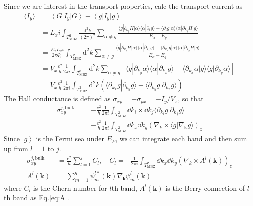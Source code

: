 \documentclass[12pt,a4paper]{article}
\newcommand{\bra}[1]{\left\langle{#1}\right|}
\newcommand{\ket}[1]{\left|{#1}\right\rangle}
\newcommand{\braket}[2]{\langle{#1}|{#2}\rangle}
\begin{document}
    Since we are interest in the transport properties, calc the transport current as
    \begin{align*}
        \langle I_y \rangle &= \bra{G}I_y\ket{G} - \bra{g}I_y\ket{g} \\
        &= L_x i \int_{T^2_{\mathrm{MBZ}}} \frac{\mathrm{d}^2 k}{(2\pi)^2} \sum_{\alpha \neq g}
        \frac{
            \braket{g}{\partial_{k_y} H|\alpha}\braket{\alpha}{\partial_t g}
            - \braket{\partial_t g}{\alpha}\braket{\alpha}{\partial_{k_y} H|g}
        }{E_\alpha - E_g} \\
        &= \frac{E_x L_x i}{2\pi \Phi_0} \int_{T^2_{\mathrm{MBZ}}} \mathrm{d}^2 k \sum_{\alpha \neq g}
        \frac{
            \braket{g}{\partial_{k_y} H|\alpha}\braket{\alpha}{\partial_{k_x} g}
            - \braket{\partial_{k_x} g}{\alpha}\braket{\alpha}{\partial_{k_y} H|g}
        }{E_\alpha - E_g} \\
        &= V_x \frac{e^2}{h} \frac{1}{2\pi i} \int_{T^2_{\mathrm{MBZ}}} \mathrm{d}^2 k \sum_{\alpha \neq g}
        \left[
            \braket{g}{\partial_{k_y} \alpha}\braket{\alpha}{\partial_{k_x} g}
            + \braket{\partial_{k_x} \alpha}{g}\braket{g}{\partial_{k_y} \alpha}
        \right] \\
        &= V_x \frac{e^2}{h} \frac{1}{2\pi i} \int_{T^2_{\mathrm{MBZ}}} \mathrm{d}^2 k
        \left(
            \braket{\partial_{k_x} g}{\partial_{k_y} g}
            - \braket{\partial_{k_y} g}{\partial_{k_x} g}
        \right)
    \end{align*}
    The Hall conductance is defined as $\sigma_{xy}=-\sigma_{yx} = -I_y/V_x$, so that
    \begin{equation}
    \begin{aligned}
        \sigma_{xy}^{j,\mathrm{bulk}}
        &\, = - \frac{e^2}{h} \frac{1}{2\pi i} \int_{T_{\mathrm{MBZ}}^2}  \dd k_i\times \dd k_j \braket{\partial_{k_i}g}{\partial_{k_j}g} \\
        &\, = - \frac{e^2}{h} \frac{1}{2\pi i} \int_{T_{\mathrm{MBZ}}^2}  \dd k_x \dd k_y \left(\nabla_k \times \braket{g}{\nabla_\mathbf{k} g} \right)_z
    \end{aligned}
    \end{equation}
    Since $\ket{g}$ is the Fermi sea under $E_F$, we can integrate each band and then sum up from $l=1$ to $j$.
    \begin{align}
        \sigma_{xy}^{j,\mathrm{bulk}}
        &\, = \frac{e^2}{h} \sum_{l=1}^{j} C_l, \quad
        C_l
        = - \frac{1}{2\pi i} \int_{T_{\mathrm{MBZ}}^2}  \dd k_x \dd k_y \left(\nabla_k \times A^l(\mathbf{k}) \right)_z \\
        A^l(\mathbf{k})
        &\, = \sum_{m=1}^{q} \psi_m^{l*}(\mathbf{k}) \nabla_{\mathbf{k}} \psi_m^{l}(\mathbf{k})
    \end{align}
    where $C_l$ is the Chern number for $l$th band, $A^l(\mathbf{k})$ is the Berry connection of $l$th band as Eq.\eqref{eq:A}.
\end{document}
